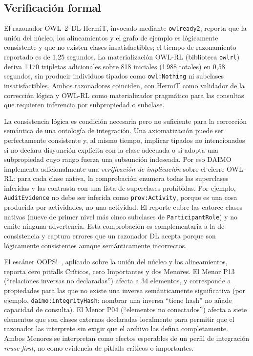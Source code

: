\documentclass[Afour,sagev,times]{sagej}
\newcommand{\code}[1]{\texttt{#1}}
\begin{document}
\subsection{Verificación formal}\label{sec:eval-engineering}

El razonador OWL~2~DL HermiT, invocado mediante \code{owlready2}, reporta que la unión del núcleo, los alineamientos y el grafo de ejemplo es lógicamente consistente y que no existen clases insatisfactibles; el tiempo de razonamiento reportado es de 1,25 segundos. La materialización OWL-RL (biblioteca \code{owlrl}) deriva 1\,170 tripletas adicionales sobre 818 iniciales (1\,988 totales) en 0,58 segundos, sin producir individuos tipados como \code{owl:Nothing} ni subclases insatisfactibles. Ambos razonadores coinciden, con HermiT como validador de la corrección lógica y OWL-RL como materializador pragmático para las consultas que requieren inferencia por subpropiedad o subclase.

La consistencia lógica es condición necesaria pero no suficiente para la corrección semántica de una ontología de integración. Una axiomatización puede ser perfectamente consistente y, al mismo tiempo, implicar tipados no intencionados si no declara disyunción explícita con la clase adecuada o si adopta una subpropiedad cuyo rango fuerza una subsunción indeseada. Por eso DAIMO implementa adicionalmente una \emph{verificación de implicación} sobre el cierre OWL-RL: para cada clase nativa, la comprobación enumera todas las superclases inferidas y las contrasta con una lista de superclases prohibidas. Por ejemplo, \code{AuditEvidence} no debe ser inferida como \code{prov:Activity}, porque es una cosa producida por actividades, no una actividad. El reporte cubre las catorce clases nativas (nueve de primer nivel más cinco subclases de \code{ParticipantRole}) y no emite ninguna advertencia. Esta comprobación es complementaria a la de consistencia y captura errores que un razonador DL acepta porque son lógicamente consistentes aunque semánticamente incorrectos.

El escáner OOPS!~\cite{oops14}, aplicado sobre la unión del núcleo y los alineamientos, reporta cero pitfalls Críticos, cero Importantes y dos Menores. El Menor P13 (``relaciones inversas no declaradas'') afecta a 34 elementos, y corresponde a propiedades para las que no existe una inversa semánticamente significativa (por ejemplo, \code{daimo:integrityHash}: nombrar una inversa ``tiene hash'' no añade capacidad de consulta). El Menor P04 (``elementos no conectados'') afecta a siete elementos que son clases externas declaradas localmente para permitir que el razonador las interprete sin exigir que el archivo las defina completamente. Ambos Menores se interpretan como efectos esperables de un perfil de integración \emph{reuse-first}, no como evidencia de pitfalls críticos o importantes.
\end{document}
